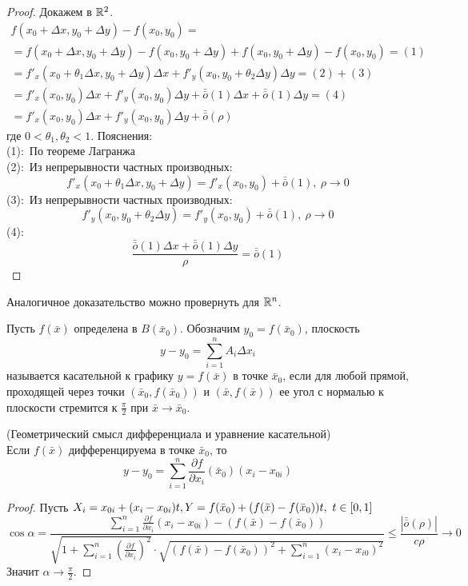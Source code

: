 \begin{proof}
    Докажем в $\mathbb{R}^2$.
    \begin{multline*}
        f(x_0+\Delta x, y_0+\Delta y)-f(x_0, y_0)=\\
        =f(x_0+\Delta x, y_0+\Delta y)-f(x_0, y_0+\Delta y)+f(x_0, y_0+\Delta y)-f(x_0, y_0)= (1)\\
        =f'_x(x_0+\theta_1 \Delta x, y_0+\Delta y)\Delta x+f'_y(x_0,y_0+\theta_2 \Delta y) \Delta y= (2)+(3)\\
        =f'_x(x_0,y_0)\Delta x+f'_y(x_0,y_0)\Delta y+\bar{\bar{o}}{(1)}\Delta x+\bar{\bar{o}}{(1)} \Delta y= (4)\\
        =f'_x(x_0,y_0)\Delta x+f'_y(x_0,y_0)\Delta y+\bar{\bar{o}}{(\rho)}
    \end{multline*}
    где $0 < \theta_1, \theta_2 < 1$. Пояснения:\\
    (1):\ По теореме Лагранжа\\
    (2):\ Из непрерывности частных производных:
    \[f'_x(x_0+\theta_1 \Delta x, y_0+\Delta y)=f'_x(x_0,y_0)+\bar{\bar{o}}{(1)},\ \rho \to 0\]
    (3):\ Из непрерывности частных производных:
    \[f'_y(x_0, y_0+\theta_2 \Delta y)=f'_y(x_0,y_0)+\bar{\bar{o}}{(1)},\ \rho \to 0\]
    (4):\ \[\frac{\bar{\bar{o}}{(1)}\Delta x+\bar{\bar{o}}{(1)} \Delta y}{\rho}=\bar{\bar{o}}{(1)}\]
\end{proof} 
\begin{comm}
    Аналогичное доказательство можно провернуть для $\mathbb{R}^n$.
\end{comm}
\begin{definition}
    Пусть $f(\bar{x})$ определена в $B(\bar{x}_0)$. Обозначим $y_0=f(\bar{x}_0)$, плоскость
    \[y-y_0=\sum\limits_{i=1}^{n}A_i \Delta x_i\]
    называется касательной к графику $y=f(\bar{x})$ в точке $\bar{x}_0$, если для любой прямой, проходящей через точки $(\bar{x}_0, f(\bar{x}_0))$ и $(\bar{x}, f(\bar{x}))$ ее угол с нормалью к плоскости стремится к $\frac{\pi}{2}$ при $\bar{x}\to \bar{x}_0$.
\end{definition} 
\begin{theorem} (Геометрический смысл дифференциала и уравнение касательной)\\
    Если $f(\bar{x})$ дифференцируема в точке $\bar{x}_0$, то 
    \[y-y_0=\sum\limits_{i=1}^{n}\frac{\partial {f}}{\partial {x_i}}(\bar{x}_0)(x_i-x_{0i})\]
\end{theorem} 
\begin{proof}
    Пусть $X_i=x_{0i}+(x_i-x_{0i})t,\\ Y=f(\bar{x}_0)+(f(\bar{x})-f(\bar{x}_0))t,\ t\in [0,1]$
    \[\cos{\alpha}=\frac{\sum\limits_{i=1}^{n}\frac{\partial {f}}{\partial {x_i}}(x_i-x_{0i})-(f(\bar{x})-f(\bar{x}_0))}{\sqrt{1+\sum\limits_{i=1}^{n}(\frac{\partial {f}}{\partial {x_i}})^2}\cdot \sqrt{(f(\bar{x})-f(\bar{x}_0))^2+\sum\limits_{i=1}^{n}(x_i-x_{i0})^2}}\leq \frac{|\bar{\bar{o}}{(\rho)}|}{c\rho}\to 0\]
    Значит $\alpha \to \frac{\pi}{2}$.
\end{proof} 
